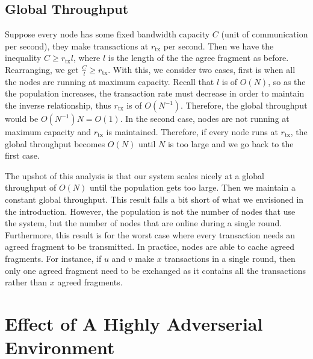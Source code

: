 \subsection{Global Throughput}
Suppose every node has some fixed bandwidth capacity $C$ (unit of communication per second),
they make transactions at $r_{\text{tx}}$ per second.
Then we have the inequality $C \ge r_{\text{tx}} l$, where $l$ is the length of the the agree fragment as before.
Rearranging, we get $\frac{C}{l} \ge r_{\text{tx}}$.
With this, we consider two cases, first is  when all the nodes are running at maximum capacity.
Recall that $l$ is of $O(N)$, so as the the population increases, 
the transaction rate must decrease in order to maintain the inverse relationship,
thus $r_\text{tx}$ is of $O(N^{-1})$. %
Therefore, the global throughput would be $O(N^{-1})N = O(1)$.
In the second case, nodes are not running at maximum capacity and $r_{\text{tx}}$ is maintained.
Therefore, if every node runs at $r_{\text{tx}}$,
the global throughput becomes $O(N)$ until $N$ is too large and we go back to the first case.

The upshot of this analysis is that our system scales nicely at a global throughput of $O(N)$ until the population gets too large.
Then we maintain a constant global throughput.
This result falls a bit short of what we envisioned in the introduction.
However, the population is not the number of nodes that use the system, but the number of nodes that are online during a single round.
Furthermore, this result is for the worst case where every transaction needs an agreed fragment to be transmitted.
In practice, nodes are able to cache agreed fragments.
For instance, if $u$ and $v$ make $x$ transactions in a single round,
then only one agreed fragment need to be exchanged as it contains all the transactions rather than $x$ agreed fragments.

\section{Effect of A Highly Adverserial Environment}
